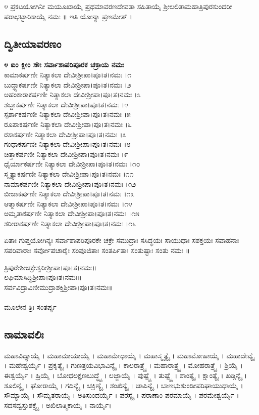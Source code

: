 ೪ ಪ್ರಕಟಯೋಗಿನೀ ಮಯೂಖಾಯೈ ಪ್ರಥಮಾವರಣದೇವತಾ ಸಹಿತಾಯೈ ಶ್ರೀಲಲಿತಾಮಹಾತ್ರಿಪುರಸುಂದರೀ ಪರಾಭಟ್ಟಾರಿಕಾಯೈ ನಮಃ ॥ ಇತಿ ಯೋನ್ಯಾ ಪ್ರಣಮೇತ್ ।
\subsection{ದ್ವಿತೀಯಾವರಣಂ}
{\bfseries ೪ ಐಂ ಕ್ಲೀಂ ಸೌಃ ಸರ್ವಾಶಾಪರಿಪೂರಕ ಚಕ್ರಾಯ ನಮಃ}\\
 ಕಾಮಾಕರ್ಷಣೀ ನಿತ್ಯಾಕಲಾ ದೇವೀಶ್ರೀಪಾ।ಪೂ।ತ।ನಮಃ ।೧\\
 ಬುದ್ಧ್ಯಾಕರ್ಷಣೀ ನಿತ್ಯಾಕಲಾ ದೇವೀಶ್ರೀಪಾ।ಪೂ।ತ।ನಮಃ ।೨\\
 ಅಹಂಕಾರಾಕರ್ಷಣೀ ನಿತ್ಯಾಕಲಾ ದೇವೀಶ್ರೀಪಾ।ಪೂ।ತ।ನಮಃ ।೩\\
 ಶಬ್ದಾಕರ್ಷಣೀ ನಿತ್ಯಾಕಲಾ ದೇವೀಶ್ರೀಪಾ।ಪೂ।ತ।ನಮಃ ।೪\\
 ಸ್ಪರ್ಶಾಕರ್ಷಣೀ ನಿತ್ಯಾಕಲಾ ದೇವೀಶ್ರೀಪಾ।ಪೂ।ತ।ನಮಃ ।೫\\
 ರೂಪಾಕರ್ಷಣೀ ನಿತ್ಯಾಕಲಾ ದೇವೀಶ್ರೀಪಾ।ಪೂ।ತ।ನಮಃ ।೬\\
 ರಸಾಕರ್ಷಣೀ ನಿತ್ಯಾಕಲಾ ದೇವೀಶ್ರೀಪಾ।ಪೂ।ತ।ನಮಃ ।೭\\
 ಗಂಧಾಕರ್ಷಣೀ ನಿತ್ಯಾಕಲಾ ದೇವೀಶ್ರೀಪಾ।ಪೂ।ತ।ನಮಃ ।೮\\
 ಚಿತ್ತಾಕರ್ಷಣೀ ನಿತ್ಯಾಕಲಾ ದೇವೀಶ್ರೀಪಾ।ಪೂ।ತ।ನಮಃ ।೯\\
 ಧೈರ್ಯಾಕರ್ಷಣೀ ನಿತ್ಯಾಕಲಾ ದೇವೀಶ್ರೀಪಾ।ಪೂ।ತ।ನಮಃ ।೧೦\\
 ಸ್ಮೃತ್ಯಾಕರ್ಷಣೀ ನಿತ್ಯಾಕಲಾ ದೇವೀಶ್ರೀಪಾ।ಪೂ।ತ।ನಮಃ ।೧೧\\
 ನಾಮಾಕರ್ಷಣೀ ನಿತ್ಯಾಕಲಾ ದೇವೀಶ್ರೀಪಾ।ಪೂ।ತ।ನಮಃ ।೧೨\\
 ಬೀಜಾಕರ್ಷಣೀ ನಿತ್ಯಾಕಲಾ ದೇವೀಶ್ರೀಪಾ।ಪೂ।ತ।ನಮಃ ।೧೩\\
 ಆತ್ಮಾಕರ್ಷಣೀ ನಿತ್ಯಾಕಲಾ ದೇವೀಶ್ರೀಪಾ।ಪೂ।ತ।ನಮಃ ।೧೪\\
 ಅಮೃತಾಕರ್ಷಣೀ ನಿತ್ಯಾಕಲಾ ದೇವೀಶ್ರೀಪಾ।ಪೂ।ತ।ನಮಃ ।೧೫\\
 ಶರೀರಾಕರ್ಷಣೀ ನಿತ್ಯಾಕಲಾ ದೇವೀಶ್ರೀಪಾ।ಪೂ।ತ।ನಮಃ ।೧೬

 ಏತಾಃ ಗುಪ್ತಯೋಗಿನ್ಯಃ ಸರ್ವಾಶಾಪರಿಪೂರಕೇ ಚಕ್ರೇ ಸಮುದ್ರಾಃ ಸಸಿದ್ಧಯಃ ಸಾಯುಧಾಃ ಸಶಕ್ತಯಃ ಸವಾಹನಾಃ ಸಪರಿವಾರಾಃ ಸರ್ವೋಪಚಾರೈಃ ಸಂಪೂಜಿತಾಃ ಸಂತರ್ಪಿತಾಃ ಸಂತುಷ್ಟಾಃ ಸಂತು ನಮಃ ॥

 ತ್ರಿಪುರೇಶೀಚಕ್ರೇಶ್ವರೀಶ್ರೀಪಾ।ಪೂ।ತ।ನಮಃ॥\\
 ಲಘಿಮಾಸಿದ್ಧಿಶ್ರೀಪಾ।ಪೂ।ತ।ನಮಃ॥\\
 ಸರ್ವವಿದ್ರಾವಿಣೀಮುದ್ರಾಶಕ್ತಿಶ್ರೀಪಾ।ಪೂ।ತ।ನಮಃ॥\\
\\
ಮೂಲೇನ ತ್ರಿಃ ಸಂತರ್ಪ್ಯ
\subsection{ನಾಮಾವಲಿಃ}
ಮಹಾವಿದ್ಯಾಯೈ । ಮಹಾಮಾಯಾಯೈ । ಮಹಾಮೇಧಾಯೈ । ಮಹಾಸ್ಮೃತ್ಯೈ । ಮಹಾಮೋಹಾಯೈ । ಮಹಾದೇವ್ಯೈ । ಮಹೇಶ್ವರ್ಯೈ । ಪ್ರಕೃತ್ಯೈ । ಗುಣತ್ರಯವಿಭಾವಿನ್ಯೈ । ಕಾಲರಾತ್ರ್ಯೈ । ಮಹಾರಾತ್ರ್ಯೈ । ಮೋಹರಾತ್ರ್ಯೈ । ಶ್ರಿಯೈ । ಈಶ್ವರ್ಯೈ । ಹ್ರಿಯೈ । ಬೋಧಲಕ್ಞಣಬುದ್ಧ್ಯೈ । ಲಜ್ಜಾಯೈ । ಪುಷ್ಟ್ಯೈ । ತುಷ್ಟ್ಯೈ । ಶಾಂತ್ಯೈ । ಕ್ಷಾಂತ್ಯೈ । ಖಡ್ಗಿನ್ಯೈ । ಶೂಲಿನ್ಯೈ । ಘೋರಾಯೈ । ಗದಿನ್ಯೈ । ಚಕ್ರಿಣ್ಯೈ । ಶಂಖಿನ್ಯೈ । ಚಾಪಿನ್ಯೈ । ಬಾಣಭುಶುಂಡೀಪರಿಘಾಯುಧಾಯೈ । ಸೌಮ್ಯಾಯೈ । ಸೌಮ್ಯತರಾಯೈ । ಅತಿಸುಂದರ್ಯೈ । ಪರಸ್ಯೈ । ಪರಾಣಾಂ ಪರಮಾಯೈ । ಪರಮೇಶ್ವರ್ಯೈ । ಸದಸದ್ವಸ್ತುಶಕ್ತ್ಯೈ । ಅಖಿಲಾತ್ಮಿಕಾಯೈ । ನಾರ್ಯೈ।\\

